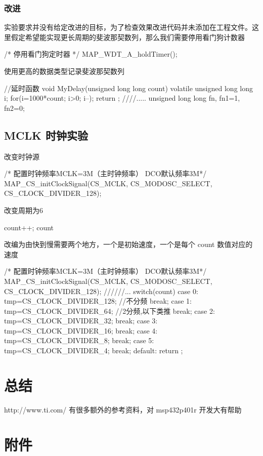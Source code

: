\documentclass[a4paper,10pt,UTF8]{paper}
\numberwithin{equation}{section}
\numberwithin{figure}{section}
\begin{document}
\subsubsection{改进}

实验要求并没有给定改进的目标，为了检查效果改进代码并未添加在工程文件。这里假定希望能实现更长周期的斐波那契数列，那么我们需要停用看门狗计数器

\begin{ccode}
  /* 停用看门狗定时器 */
  MAP_WDT_A_holdTimer();
\end{ccode}

使用更高的数据类型记录斐波那契数列

\begin{ccode}
  
  //延时函数
  void MyDelay(unsigned long long count)
  {
    volatile unsigned long long i;
    for(i=1000*count; i>0; i--);
    return ;
  }
  ////.....
  unsigned long long fn, fn1=1, fn2=0;
\end{ccode}

\subsection{MCLK 时钟实验}

改变时钟源

\begin{ccode}
  /* 配置时钟频率MCLK=3M（主时钟频率） DCO默认频率3M*/   
  MAP_CS_initClockSignal(CS_MCLK, CS_MODOSC_SELECT, CS_CLOCK_DIVIDER_128); 
\end{ccode}

改变周期为6

\begin{ccode}
  count++;
  count%
\end{ccode}

改编为由快到慢需要两个地方，一个是初始速度，一个是每个 count 数值对应的速度

\begin{ccode}
  /* 配置时钟频率MCLK=3M（主时钟频率） DCO默认频率3M*/   
  MAP_CS_initClockSignal(CS_MCLK, CS_MODOSC_SELECT, CS_CLOCK_DIVIDER_128); 
  //////...
  switch(count)
  {
    case 0:
      tmp=CS_CLOCK_DIVIDER_128; //不分频
      break;
    case 1:
      tmp=CS_CLOCK_DIVIDER_64; //2分频,以下类推
      break;
    case 2:
      tmp=CS_CLOCK_DIVIDER_32;
      break;
    case 3:
      tmp=CS_CLOCK_DIVIDER_16;
      break;
    case 4:
      tmp=CS_CLOCK_DIVIDER_8;
      break;
    case 5:
      tmp=CS_CLOCK_DIVIDER_4;
      break;           
    default:
      return ;
  }
\end{ccode}

\section{总结}

http://www.ti.com/ 有很多额外的参考资料，对 msp432p401r 开发大有帮助

\section{附件}
\end{document}
